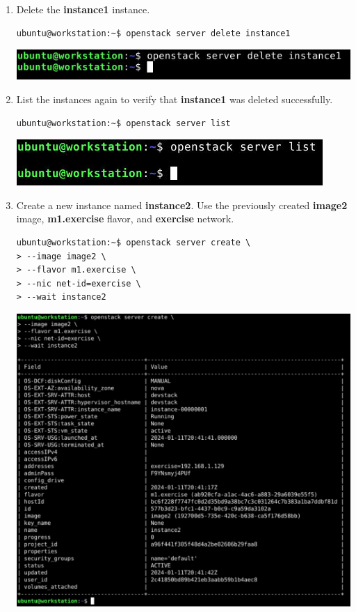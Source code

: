 \documentclass[letterpaper, 12pt]{article}
\begin{document}
\begin{enumerate}
    \item Delete the \textbf{instance1} instance.
\begin{lstlisting}
ubuntu@workstation:~$ openstack server delete instance1
\end{lstlisting}

    \begin{center}
        \includegraphics[width=\linewidth]{images/part4/step10.png}
    \end{center}

    \item List the instances again to verify that \textbf{instance1} was deleted successfully.
\begin{lstlisting}
ubuntu@workstation:~$ openstack server list
\end{lstlisting}

    \begin{center}
        \includegraphics[width=\linewidth]{images/part4/step11.png}
    \end{center}

    \item Create a new instance named \textbf{instance2}. Use the previously created \textbf{image2} image,
    \textbf{m1.exercise} flavor, and \textbf{exercise} network.
\begin{lstlisting}
ubuntu@workstation:~$ openstack server create \
> --image image2 \
> --flavor m1.exercise \
> --nic net-id=exercise \
> --wait instance2
\end{lstlisting}

    \begin{center}
        \includegraphics[width=\linewidth]{images/part4/step12.png}
    \end{center}


\end{enumerate}
\end{document}
